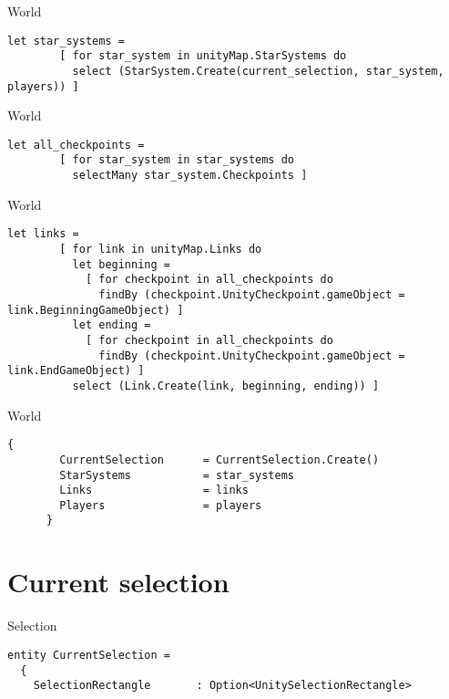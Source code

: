 \documentclass{beamer}
\begin{document}
\begin{frame}[fragile]{World}
\begin{lstlisting}[frame=shadowbox]
      let star_systems = 
        [ for star_system in unityMap.StarSystems do
          select (StarSystem.Create(current_selection, star_system, players)) ]
\end{lstlisting}
\end{frame}

\begin{frame}[fragile]{World}
\begin{lstlisting}[frame=shadowbox]
      let all_checkpoints = 
        [ for star_system in star_systems do
          selectMany star_system.Checkpoints ]
\end{lstlisting}
\end{frame}

\begin{frame}[fragile]{World}
\begin{lstlisting}[frame=shadowbox]
      let links = 
        [ for link in unityMap.Links do
          let beginning = 
            [ for checkpoint in all_checkpoints do
              findBy (checkpoint.UnityCheckpoint.gameObject = link.BeginningGameObject) ]
          let ending = 
            [ for checkpoint in all_checkpoints do
              findBy (checkpoint.UnityCheckpoint.gameObject = link.EndGameObject) ]
          select (Link.Create(link, beginning, ending)) ]
\end{lstlisting}
\end{frame}

\begin{frame}[fragile]{World}
\begin{lstlisting}[frame=shadowbox]
      {
        CurrentSelection      = CurrentSelection.Create()
        StarSystems           = star_systems
        Links                 = links
        Players               = players
      }
\end{lstlisting}
\end{frame}


\section{Current selection}
\begin{frame}[fragile]{Selection}
\begin{lstlisting}[frame=shadowbox]
entity CurrentSelection =
  {
    SelectionRectangle       : Option<UnitySelectionRectangle>
\end{lstlisting}
\end{frame}
\end{document}
